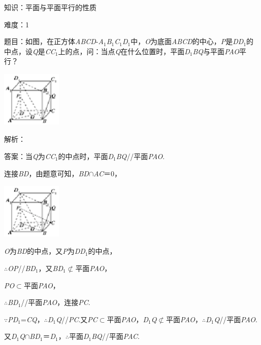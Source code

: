 \documentclass{article} %
\begin{document}
知识：平面与平面平行的性质

难度：1

题目：如图，在正方体\textit{ABCD}-\textit{A}${}_{1}$\textit{B}${}_{1}$\textit{C}${}_{1}$\textit{D}${}_{1}$中，\textit{O}为底面\textit{ABCD}的中心，\textit{P}是\textit{DD}${}_{1}$的中点，设\textit{Q}是\textit{CC}${}_{1}$上的点，问：当点\textit{Q}在什么位置时，平面\textit{D}${}_{1}$\textit{BQ}与平面\textit{PAO}平行？

\includegraphics*[width=1.12in, height=1.06in, keepaspectratio=false]{image182}

解析：

答案：当\textit{Q}为\textit{CC}${}_{1}$的中点时，平面\textit{D}${}_{1}$\textit{BQ}//平面\textit{PAO}.

连接\textit{BD}，由题意可知，\textit{BD}$\mathrm{\cap}$\textit{AC}＝0，

\includegraphics*[width=1.12in, height=1.06in, keepaspectratio=false]{image183}

\textit{O}为\textit{BD}的中点，又\textit{P}为\textit{DD}${}_{1}$的中点，

$\mathrm{\therefore}$\textit{OP}//\textit{BD}${}_{1}$，又\textit{BD}${}_{1}$$\mathrm{\nsubset}$平面\textit{PAO}，

\textit{PO}$\mathrm{\subset }$平面\textit{PAO}，

$\mathrm{\therefore}$\textit{BD}${}_{1}$//平面\textit{PAO}，连接\textit{PC}.

$\mathrm{\because}$\textit{PD}${}_{1}$=\textit{CQ}，$\mathrm{\therefore}$\textit{D}${}_{1}$\textit{Q}//\textit{PC}.又\textit{PC}$\mathrm{\subset }$平面\textit{PAO}，\textit{D}${}_{1}$\textit{Q}$\mathrm{\nsubset}$平面\textit{PAO}，$\mathrm{\therefore}$\textit{D}${}_{1}$\textit{Q}//平面\textit{PAO}.

又\textit{D}${}_{1}$\textit{Q}$\mathrm{\cap}$\textit{BD}${}_{1}$＝\textit{D}${}_{1}$，$\mathrm{\therefore}$平面\textit{D}${}_{1}$\textit{BQ}//平面\textit{PAC}.
\end{document}
